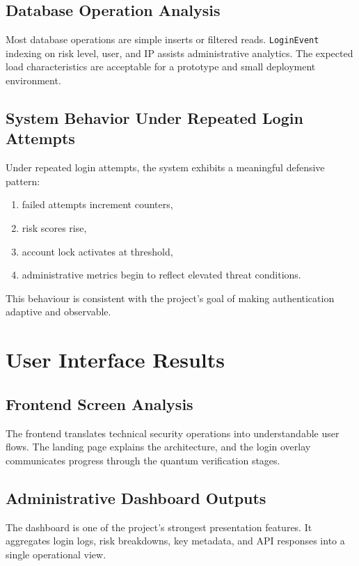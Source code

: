 \documentclass[12pt,a4paper]{report}
\begin{document}
\subsection{Database Operation Analysis}
Most database operations are simple inserts or filtered reads. \texttt{LoginEvent} indexing on risk level, user, and IP assists administrative analytics. The expected load characteristics are acceptable for a prototype and small deployment environment.

\subsection{System Behavior Under Repeated Login Attempts}
Under repeated login attempts, the system exhibits a meaningful defensive pattern:

\begin{enumerate}
    \item failed attempts increment counters,
    \item risk scores rise,
    \item account lock activates at threshold,
    \item administrative metrics begin to reflect elevated threat conditions.
\end{enumerate}

This behaviour is consistent with the project's goal of making authentication adaptive and observable.

\section{User Interface Results}

\subsection{Frontend Screen Analysis}
The frontend translates technical security operations into understandable user flows. The landing page explains the architecture, and the login overlay communicates progress through the quantum verification stages.

\subsection{Administrative Dashboard Outputs}
The dashboard is one of the project's strongest presentation features. It aggregates login logs, risk breakdowns, key metadata, and API responses into a single operational view.
\end{document}
